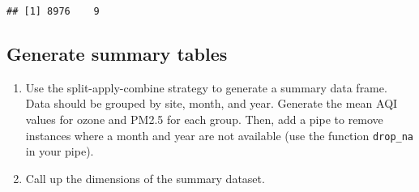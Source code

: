 \documentclass[]{article}
\newenvironment{Shaded}{\begin{snugshade}}{\end{snugshade}}
\newcommand{\KeywordTok}[1]{\textcolor[rgb]{0.13,0.29,0.53}{\textbf{#1}}}
\newcommand{\DataTypeTok}[1]{\textcolor[rgb]{0.13,0.29,0.53}{#1}}
\newcommand{\DecValTok}[1]{\textcolor[rgb]{0.00,0.00,0.81}{#1}}
\newcommand{\StringTok}[1]{\textcolor[rgb]{0.31,0.60,0.02}{#1}}
\newcommand{\CommentTok}[1]{\textcolor[rgb]{0.56,0.35,0.01}{\textit{#1}}}
\newcommand{\OtherTok}[1]{\textcolor[rgb]{0.56,0.35,0.01}{#1}}
\newcommand{\OperatorTok}[1]{\textcolor[rgb]{0.81,0.36,0.00}{\textbf{#1}}}
\newcommand{\NormalTok}[1]{#1}
\begin{document}
\begin{verbatim}
## [1] 8976    9
\end{verbatim}

\begin{Shaded}
\end{Shaded}

\subsection{Generate summary tables}\label{generate-summary-tables}

\begin{enumerate}
\def\labelenumi{\arabic{enumi}.}
\setcounter{enumi}{11}
\item
  Use the split-apply-combine strategy to generate a summary data frame.
  Data should be grouped by site, month, and year. Generate the mean AQI
  values for ozone and PM2.5 for each group. Then, add a pipe to remove
  instances where a month and year are not available (use the function
  \texttt{drop\_na} in your pipe).
\item
  Call up the dimensions of the summary dataset.
\end{enumerate}

\begin{Shaded}
\end{Shaded}
\end{document}
